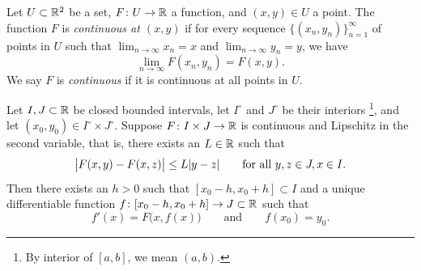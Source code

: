 \begin{defn}
Let $U \subset {\mathbb{R}}^2$ be a set, $F \colon U \to {\mathbb{R}}$ a function,
and $(x,y) \in U$ a point.  The function $F$ is
\emph{continuous at $(x,y)$}
if for every sequence
$\bigl\{ (x_n,y_n) \bigr\}_{n=1}^\infty$ of points in $U$ such that
$\lim_{n\to\infty} x_n = x$ and 
$\lim_{n\to\infty} y_n = y$, we have 
\begin{equation*}
\lim_{n \to \infty} F(x_n,y_n) = 
F(x,y) .
\end{equation*}
We say $F$ is \emph{continuous} if it is continuous at all points in $U$.
\end{defn}

\begin{thm}%
%
\label{thm:fs:picard}
Let $I, J \subset {\mathbb{R}}$ be closed bounded intervals, 
let $I^\circ$ and $J^\circ$ be their interiors%
\footnote{By interior of $[a,b]$, we mean $(a,b)$.},
and
let $(x_0,y_0) \in I^\circ \times J^\circ$.
Suppose $F \colon I \times J \to {\mathbb{R}}$ is continuous
and Lipschitz in the second variable, that is, there exists
an $L \in {\mathbb{R}}$ such that
\begin{equation*}
\bigl\lvert {F(x,y) - F(x,z)} \bigr\rvert \leq L \lvert {y-z} \rvert
\qquad \text{for all } y,z \in J, x \in I .
\end{equation*}
Then there exists an $h > 0$ such that $[x_0-h,x_0+h] \subset I$ and a unique differentiable
function $f \colon [x_0 - h, x_0 + h] \to J \subset {\mathbb{R}}$ such that
\begin{equation} \label{picard:diffeq}
f'(x) = F\bigl(x,f(x)\bigr) \qquad \text{and} \qquad f(x_0) = y_0.
\end{equation}
\end{thm}

